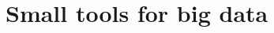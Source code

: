 \documentclass[10pt]{beamer}
\begin{document}


\section{Small tools for big data}
\subsection{}

%	
\end{document}
